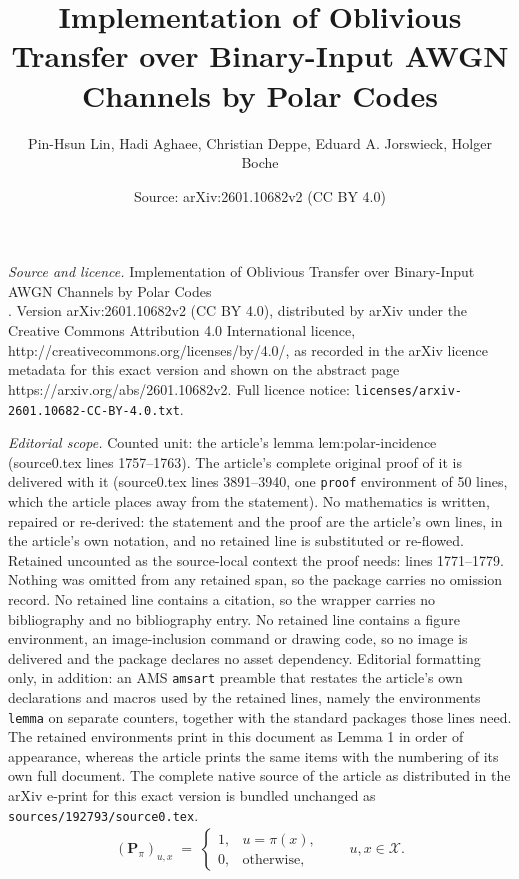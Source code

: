 \documentclass[10pt,a4paper]{amsart}
\title{Implementation of Oblivious Transfer over Binary-Input AWGN Channels by Polar Codes \\}
\author{Pin-Hsun Lin, Hadi Aghaee, Christian Deppe, Eduard A. Jorswieck, Holger Boche}
\date{Source: arXiv:2601.10682v2 (CC BY 4.0)}
\begin{document}
\maketitle

\noindent\emph{Source and licence.} Implementation of Oblivious Transfer over Binary-Input AWGN Channels by Polar Codes \\. Version arXiv:2601.10682v2 (CC BY 4.0), distributed by arXiv under the Creative Commons Attribution 4.0 International licence, http://creativecommons.org/licenses/by/4.0/, as recorded in the arXiv licence metadata for this exact version and shown on the abstract page https://arxiv.org/abs/2601.10682v2. Full licence notice: \texttt{licenses/arxiv-2601.10682-CC-BY-4.0.txt}.\par\smallskip

\noindent\textit{Editorial scope.} Counted unit: the article's lemma lem:polar-incidence (source0.tex lines 1757--1763). The article's complete original proof of it is delivered with it (source0.tex lines 3891--3940, one \texttt{proof} environment of 50 lines, which the article places away from the statement). No mathematics is written, repaired or re-derived: the statement and the proof are the article's own lines, in the article's own notation, and no retained line is substituted or re-flowed.  Retained uncounted as the source-local context the proof needs: lines 1771--1779.  Nothing was omitted from any retained span, so the package carries no omission record.  No retained line contains a citation, so the wrapper carries no bibliography and no bibliography entry.  No retained line contains a figure environment, an image-inclusion command or drawing code, so no image is delivered and the package declares no asset dependency.  Editorial formatting only, in addition: an AMS \texttt{amsart} preamble that restates the article's own declarations and macros used by the retained lines, namely the environments \texttt{lemma} on separate counters, together with the standard packages those lines need.  The retained environments print in this document as Lemma 1 in order of appearance, whereas the article prints the same items with the numbering of its own full document.  The complete native source of the article as distributed in the arXiv e-print for this exact version is bundled unchanged as \texttt{sources/192793/source0.tex}.
\begin{align}\label{EQ_P_pi-compact}
  (\mathbf P_\pi)_{u,x}
  \;=\;
  \begin{cases}
    1, & u = \pi(x),\\
    0, & \text{otherwise},
  \end{cases}
  \qquad u,x\in\mathcal X.
\end{align}
\end{document}
